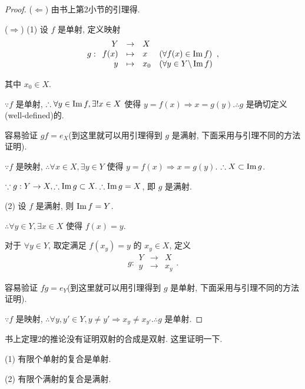 \documentclass{ctexart}
\begin{document}
\begin{proof}
    ($\Leftarrow$) 由书上第2小节的引理得.
    
    ($\Rightarrow$) (1) 设 $f$ 是单射, 定义映射
    \[g:\begin{array}{rcll}
    Y & \to & X \\
    f(x) & \mapsto & x & (\forall f(x)\in\operatorname{Im} f) \\
    y & \mapsto & x_0 & (\forall y\in Y\backslash\operatorname{Im} f)
    \end{array},\]

    其中 $x_0\in X$.

    $\because f$ 是单射, $\therefore\forall y\in\operatorname{Im} f,\exists!x\in X$ 使得 $y=f(x)\Rightarrow x=g(y).\therefore g$ 是确切定义(well-defined)的.

    容易验证 $gf=e_X$(到这里就可以用引理得到 $g$ 是满射, 下面采用与引理不同的方法证明).

    $\because f$ 是映射, $\therefore\forall x\in X,\exists y\in Y$ 使得 $y=f(x)\Rightarrow x=g(y)$. $\therefore X\subset\operatorname{Im} g$.

    $\because g:Y\to X,\therefore\operatorname{Im} g\subset X.\therefore\operatorname{Im} g=X$, 即 $g$ 是满射.

    (2) 设 $f$ 是满射, 则 $\operatorname{Im} f=Y$.

    $\therefore\forall y\in Y,\exists x\in X$ 使得 $f(x)=y$.

    对于 $\forall y\in Y$, 取定满足 $f(x_y)=y$ 的 $x_y\in X$, 定义
    \[g:\begin{array}{rcl}
    Y & \to & X \\
    y & \to & x_y
    \end{array}.\]

    容易验证 $fg=e_Y$(到这里就可以用引理得到 $g$ 是单射, 下面采用与引理不同的方法证明).

    $\because f$ 是映射, $\therefore\forall y,y'\in Y,y\neq y'\Rightarrow x_y\neq x_{y'}.\therefore g$ 是单射.
\end{proof}
书上定理2的推论没有证明双射的合成是双射. 这里证明一下.
\begin{theorem}
    (1) 有限个单射的复合是单射.
    
    (2) 有限个满射的复合是满射.
\end{theorem}
\end{document}
